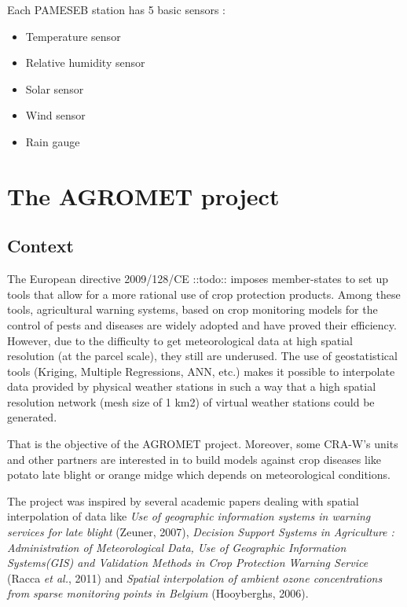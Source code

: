 \documentclass[12pt,twoside]{reedthesis}
\providecommand{\tightlist}{%
  \setlength{\itemsep}{0pt}\setlength{\parskip}{0pt}}
\theoremstyle{definition}
\theoremstyle{definition}
\theoremstyle{definition}
\theoremstyle{remark}
\begin{document}
Each PAMESEB station has 5 basic sensors :
\begin{itemize}
\tightlist
\item
  Temperature sensor
\item
  Relative humidity sensor
\item
  Solar sensor
\item
  Wind sensor
\item
  Rain gauge
\end{itemize}
\section{The AGROMET project}\label{the-agromet-project}

\subsection{Context}\label{context}

The European directive 2009/128/CE ::todo:: imposes member-states to set
up tools that allow for a more rational use of crop protection products.
Among these tools, agricultural warning systems, based on crop
monitoring models for the control of pests and diseases are widely
adopted and have proved their efficiency. However, due to the difficulty
to get meteorological data at high spatial resolution (at the parcel
scale), they still are underused. The use of geostatistical tools
(Kriging, Multiple Regressions, ANN, etc.) makes it possible to
interpolate data provided by physical weather stations in such a way
that a high spatial resolution network (mesh size of 1 km2) of virtual
weather stations could be generated.

That is the objective of the AGROMET project. Moreover, some CRA-W's
units and other partners are interested in to build models against crop
diseases like potato late blight or orange midge which depends on
meteorological conditions.

The project was inspired by several academic papers dealing with spatial
interpolation of data like \emph{Use of geographic information systems
in warning services for late blight} (Zeuner, 2007), \emph{Decision
Support Systems in Agriculture : Administration of Meteorological Data,
Use of Geographic Information Systems(GIS) and Validation Methods in
Crop Protection Warning Service} (Racca \emph{et al.}, 2011) and
\emph{Spatial interpolation of ambient ozone concentrations from sparse
monitoring points in Belgium} (Hooyberghs, 2006).
\end{document}
